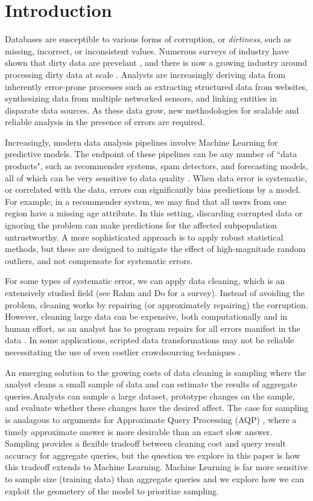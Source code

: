 \section{Introduction}
Databases are susceptible to various forms of corruption, or \emph{dirtiness}, such as missing, incorrect, or inconsistent values.
Numerous surveys of industry have shown that dirty data are prevelant \cite{Gartner}, and there is now a growing industry around processing dirty data at scale \cite{fortunearticle}.
Analysts are increasingly deriving data from inherently error-prone processes such as extracting structured data from websites, synthesizing data from multiple networked sensors, and linking entities in disparate data sources.
As these data grow, new methodologies for scalable and reliable analysis in the presence of errors are required. 

Increasingly, modern data analysis pipelines involve Machine Learning for predictive models.
The endpoint of these pipelines can be any number of ``data products", such as recommender systems, spam detectors, and forecasting models, all of which can be very sensitive to data quality \cite{xiaofeature}.
When data error is systematic, or correlated with the data, errors can significantly bias predictions by a model.
For example, in a recommender system, we may find that all users from one region have a missing age attribute.
In this setting, discarding corrupted data or ignoring the problem can make predictions for the affected subpopulation untrustworthy.
A more sophisticated approach is to apply robust statistical methods, but these are designed to mitigate the effect of high-magnitude random outliers, and not compensate for systematic errors.

For some types of systematic error, we can apply data cleaning, which is an extensively studied field (see Rahm and Do \cite{rahm2000data} for a survey).
Instead of avoiding the problem, cleaning works by repairing (or approximately repairing) the corruption.
However, cleaning large data can be expensive, both computationally and in human effort, as an analyst has to program repairs for all errors manifest in the data \cite{kandel2012}.
In some applications, scripted data transformations may not be reliable necessitating the use of even costlier crowdsourcing techniques \cite{gokhale2014corleone,park2014crowdfill}.

An emerging solution to the growing costs of data cleaning is sampling \cite{wang1999sample} where the analyst cleans a small sample of data and can estimate the results of aggregate queries.Analysts can sample a large dataset, prototype changes on the sample, and evaluate whether these changes have the desired affect.
The case for sampling is analagous to arguments for Approximate Query Processing (AQP) \cite{DBLP:conf/eurosys/AgarwalMPMMS13}, where a timely approximate answer is more desirable than an exact slow answer.
Sampling provides a flexible tradeoff between cleaning cost and query result accuracy for aggregate queries, but the question we explore in this paper is how this tradeoff extends to Machine Learning. 
Machine Learning is far more sensitive to sample size (training data) than aggregate queries and we explore how we can exploit the geometery of the model to prioritize sampling.

